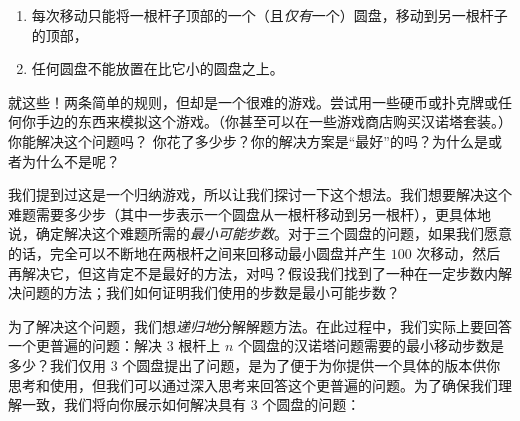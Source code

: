 \begin{enumerate}
    \item 每次移动只能将一根杆子顶部的一个（且\emph{仅有}一个）圆盘，移动到另一根杆子的顶部，
    \item 任何圆盘不能放置在比它小的圆盘之上。
\end{enumerate}
就这些！两条简单的规则，但却是一个很难的游戏。尝试用一些硬币或扑克牌或任何你手边的东西来模拟这个游戏。（你甚至可以在一些游戏商店购买汉诺塔套装。）你能解决这个问题吗？ 你花了多少步？你的解决方案是``最好''的吗？为什么是或者为什么不是呢？

我们提到过这是一个归纳游戏，所以让我们探讨一下这个想法。我们想要解决这个难题需要多少步（其中一步表示一个圆盘从一根杆移动到另一根杆），更具体地说，确定解决这个难题所需的\emph{最小可能步数}。对于三个圆盘的问题，如果我们愿意的话，完全可以不断地在两根杆之间来回移动最小圆盘并产生 $100$ 次移动，然后再解决它，但这肯定不是最好的方法，对吗？假设我们找到了一种在一定步数内解决问题的方法；我们如何证明我们使用的步数是最小可能步数？

为了解决这个问题，我们想\emph{递归地}分解解题方法。在此过程中，我们实际上要回答一个更普遍的问题：解决 $3$ 根杆上 $n$ 个圆盘的汉诺塔问题需要的最小移动步数是多少？我们仅用 $3$ 个圆盘提出了问题，是为了便于为你提供一个具体的版本供你思考和使用，但我们可以通过深入思考来回答这个更普遍的问题。为了确保我们理解一致，我们将向你展示如何解决具有 $3$ 个圆盘的问题：

\begin{center}
\end{center}

